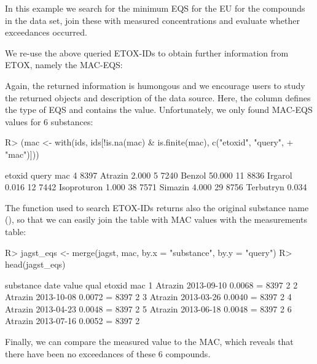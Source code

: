 \documentclass[article]{jss}
\begin{document}
In this example we search for the minimum EQS for the EU for the
compounds in the  data set, join these with measured
concentrations and evaluate whether exceedances occurred.

We re-use the above queried ETOX-IDs to obtain further information
from ETOX, namely the MAC-EQS:
% 
\begin{CodeChunk}
\end{CodeChunk}
%
Again, the returned information is humongous and we encourage users to study the returned objects and description of the data source.
Here, the column  defines the type of EQS and  contains the value.
Unfortunately, we only found MAC-EQS values for 6 substances:
%
\begin{CodeChunk}
\begin{CodeInput}
R> (mac <- with(ids, ids[!is.na(mac) & is.finite(mac), c("etoxid", "query",
+    "mac")]))
\end{CodeInput}
\begin{CodeOutput}
   etoxid       query    mac
4    8397     Atrazin  2.000
5    7240      Benzol 50.000
11   8836     Irgarol  0.016
12   7442 Isoproturon  1.000
38   7571     Simazin  4.000
29   8756   Terbutryn  0.034
\end{CodeOutput}
\end{CodeChunk}
%
The  function used to search ETOX-IDs returns also
the original substance name (), so that we can easily join
the table with MAC values with the measurements table:
% 
\begin{CodeChunk}
\begin{CodeInput}
R> jagst_eqs <- merge(jagst, mac, by.x = "substance", by.y = "query")
R> head(jagst_eqs)
\end{CodeInput}
\begin{CodeOutput}
  substance       date  value qual etoxid mac
1   Atrazin 2013-09-10 0.0068    =   8397   2
2   Atrazin 2013-10-08 0.0072    =   8397   2
3   Atrazin 2013-03-26 0.0040    =   8397   2
4   Atrazin 2013-04-23 0.0048    =   8397   2
5   Atrazin 2013-06-18 0.0048    =   8397   2
6   Atrazin 2013-07-16 0.0052    =   8397   2
\end{CodeOutput}
\end{CodeChunk}
%
Finally, we can compare the measured value to the MAC, which reveals that there have been no exceedances of these 6 compounds.
\end{document}
